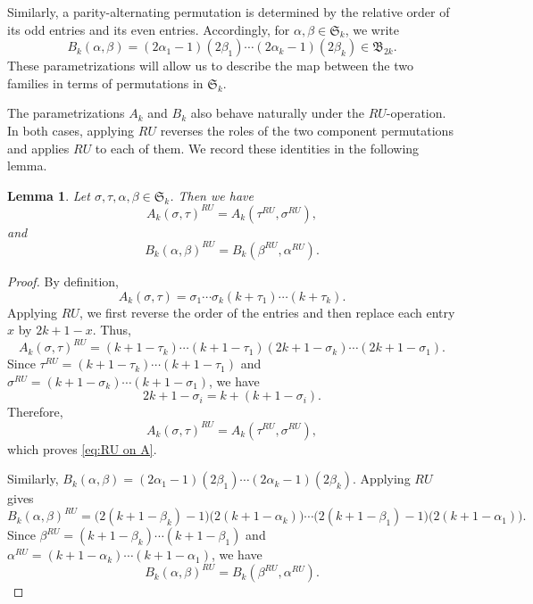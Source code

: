 \documentclass[12pt]{amsart}
\newtheorem{lem}[thm]{Lemma}
\theoremstyle{definition}
\numberwithin{equation}{section}
\begin{document}
Similarly, a parity-alternating permutation is determined by the
relative order of its odd entries and its even entries. Accordingly, for
$\alpha,\beta\in \mathfrak S_k$, we write
\begin{equation}
B_k(\alpha,\beta) = (2\alpha_1-1)(2\beta_1)\cdots(2\alpha_k-1)(2\beta_k) \in \mathfrak B_{2k}.
\end{equation}
These parametrizations will allow us to describe the map between the two
families in terms of permutations in $\mathfrak S_k$.

The parametrizations $A_k$ and $B_k$ also behave naturally under the
$RU$-operation. In both cases, applying $RU$ reverses the roles of the
two component permutations and applies $RU$ to each of them. We record
these identities in the following lemma.

\begin{lem}\label{l:RU on A B}
Let $\sigma,\tau,\alpha,\beta\in\mathfrak S_k$. Then we have
\begin{equation}
A_k(\sigma,\tau)^{RU}
=
A_k(\tau^{RU},\sigma^{RU}),
\label{eq:RU on A}
\end{equation}
and
\begin{equation}
B_k(\alpha,\beta)^{RU}
=
B_k(\beta^{RU},\alpha^{RU}).
\label{eq:RU on B}
\end{equation}
\end{lem}

\begin{proof}
By definition,
\begin{equation*}
A_k(\sigma,\tau)
=
\sigma_1\cdots\sigma_k
(k+\tau_1)\cdots(k+\tau_k).
\end{equation*}
Applying $RU$, we first reverse the order of the entries and then
replace each entry $x$ by $2k+1-x$. Thus,
\begin{equation*}
A_k(\sigma,\tau)^{RU}
={}
(k+1-\tau_k)\cdots(k+1-\tau_1)
(2k+1-\sigma_k)\cdots(2k+1-\sigma_1).
\end{equation*}
Since
$\tau^{RU}
=
(k+1-\tau_k)\cdots(k+1-\tau_1)$
and
$\sigma^{RU}
=
(k+1-\sigma_k)\cdots(k+1-\sigma_1)$,
we have
\begin{equation*}
2k+1-\sigma_i
=
k+(k+1-\sigma_i).
\end{equation*}
Therefore,
\begin{equation*}
A_k(\sigma,\tau)^{RU}
=
A_k(\tau^{RU},\sigma^{RU}),
\end{equation*}
which proves \eqref{eq:RU on A}.

Similarly,
$B_k(\alpha,\beta)
=
(2\alpha_1-1)(2\beta_1)\cdots
(2\alpha_k-1)(2\beta_k)$.
Applying $RU$ gives
\begin{equation*}
B_k(\alpha,\beta)^{RU}
={}
\bigl(2(k+1-\beta_k)-1\bigr)
\bigl(2(k+1-\alpha_k)\bigr)\cdots
\bigl(2(k+1-\beta_1)-1\bigr)
\bigl(2(k+1-\alpha_1)\bigr).
\end{equation*}
Since
$\beta^{RU}
=
(k+1-\beta_k)\cdots(k+1-\beta_1)$
and
$\alpha^{RU}
=
(k+1-\alpha_k)\cdots(k+1-\alpha_1)$,
we have
\begin{equation*}
B_k(\alpha,\beta)^{RU} = B_k(\beta^{RU},\alpha^{RU}).
\end{equation*}
\end{proof}
\end{document}
